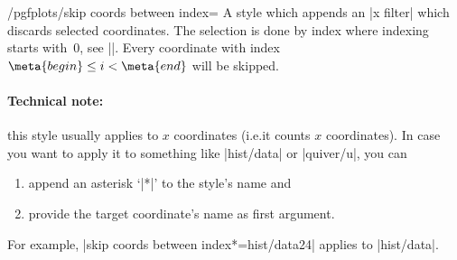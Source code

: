 \begin{stylekey}{/pgfplots/skip coords between index=}
    A style which appends an |x filter| which discards selected coordinates.
    The selection is done by index where indexing starts with~$0$, see
    |\coordindex|. Every coordinate with index $\meta{begin} \le i <
    \meta{end}$ will be skipped.
\begin{codeexample}[]
\end{codeexample}

    \paragraph{Technical note:}

    this style usually applies to $x$ coordinates (i.e.\@ it counts $x$
    coordinates). In case you want to apply it to something like |hist/data| or
    |quiver/u|, you can
    \begin{enumerate}
        \item append an asterisk `|*|' to the style's name and
        \item provide the target coordinate's name as first argument.
    \end{enumerate}
    For example, |skip coords between index*={hist/data}{2}{4}| applies to
    |hist/data|.
\end{stylekey}

